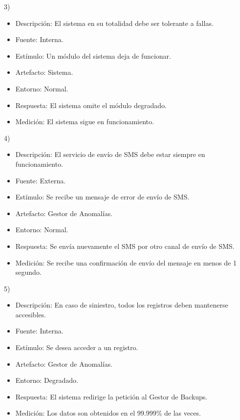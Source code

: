 \documentclass{article}
\theoremstyle{definition}
\theoremstyle{remark}
\begin{document}
3)
\begin{itemize}
  \item Descripción: El sistema en su totalidad debe ser tolerante a fallas.
  \item Fuente: Interna.
  \item Estímulo: Un módulo del sistema deja de funcionar.
  \item Artefacto: Sistema.
  \item Entorno: Normal.
  \item Respuesta: El sistema omite el módulo degradado.
  \item Medición: El sistema sigue en funcionamiento.
\end{itemize}

\pagebreak

4)
\begin{itemize}
  \item Descripción: El servicio de envío de SMS debe estar siempre en funcionamiento.
  \item Fuente: Externa.
  \item Estímulo: Se recibe un mensaje de error de envío de SMS.
  \item Artefacto: Gestor de Anomalías.
  \item Entorno: Normal.
  \item Respuesta: Se envía nuevamente el SMS por otro canal de envío de SMS.
  \item Medición: Se recibe una confirmación de envío del mensaje en menos de 1 segundo.
\end{itemize}

5)
\begin{itemize}
  \item Descripción: En caso de siniestro, todos los registros deben mantenerse accesibles.
  \item Fuente: Interna.
  \item Estímulo: Se desea acceder a un registro.
  \item Artefacto: Gestor de Anomalías.
  \item Entorno: Degradado.
  \item Respuesta: El sistema redirige la petición al Gestor de Backups.
  \item Medición: Los datos son obtenidos en el 99.999\% de las veces.
\end{itemize}
\end{document}
